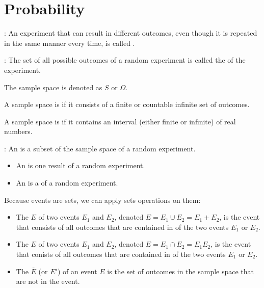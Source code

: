 \chapter{Probability}

    \par {}: An experiment that can result in different outcomes,
      even though it is repeated in the same manner every time, is called
      .

      \par {}: The set of all possible outcomes of a random
        experiment is called the  of the experiment.
        \par The sample space is denoted as $S$ or $\Omega$.

      \par A sample space is  if it consists of a finite or
        countable infinite set of outcomes.
      \par A sample space is  if it contains an interval (either
        finite or infinite) of real numbers.

      \par {}: An  is a subset of the sample space of a
        random experiment.
      \par {}
        \begin{itemize}
          \item An  is one result of a random experiment.
          \item An  is a  of a random experiment.
        \end{itemize}

      \par Because events are sets, we can apply sets operations on them:
      \begin{itemize}
        \item The  $E$ of two events $E_1$ and $E_2$, denoted $E =
          E_1 \cup E_2 = E_1 + E_2$, is the event that consists of all outcomes
          that are contained in  of the two events $E_1$ or $E_2$.
        \item The  $E$ of two events $E_1$ and $E_2$, denoted
          $E = E_1 \cap E_2 = E_1 E_2$, is the event that conists of all
          outcomes that are contained in  of the two events $E_1$ or
          $E_2$.
        \item The  $\bar{E}$ (or $E'$) of an event $E$
           is the set of outcomes in the sample space
          that are not in the event.
      \end{itemize}

